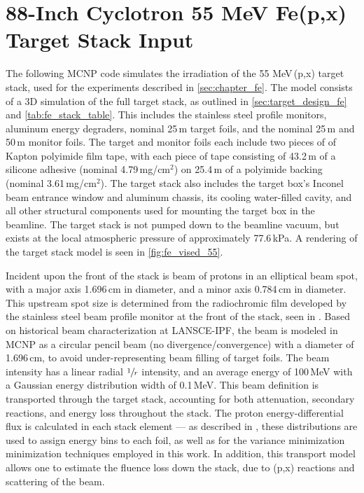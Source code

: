 



\section{88-Inch Cyclotron 55 MeV Fe(p,x) Target Stack Input} \label{sec:88_mcnp_deck}



The following MCNP code simulates the irradiation of the 55 MeV\,(p,x) target stack, used for the experiments described in  \autoref{sec:chapter_fe}.
The model consists of a 3D simulation of the full target stack, as outlined in \autoref{sec:target_design_fe} and  \autoref{tab:fe_stack_table}.
This includes the stainless steel profile monitors, aluminum energy degraders, nominal 25\,\mmicro m  target foils, and the nominal 25\,\mmicro m   and 50\,\mmicro m  monitor foils.
The target and monitor foils each include two pieces of of Kapton polyimide film tape, with each piece of  tape consisting of 43.2\,\mmicro m of a silicone adhesive (nominal 4.79\,mg/cm$^2$) on 25.4\,\mmicro m of a polyimide backing (nominal 3.61\,mg/cm$^2$).
The target stack also includes the target box's Inconel beam entrance window and aluminum chassis, its cooling water-filled cavity, and all other structural components used for mounting the target box in the beamline.
The target stack is not pumped down to the beamline vacuum, but exists at the local atmospheric pressure of approximately 77.6\,kPa.
A rendering of the target stack model  is seen in \autoref{fig:fe_vised_55}.



Incident upon the front of the stack is  beam of protons in an elliptical beam spot, with a major axis 1.696\,cm in diameter, and a minor axis 0.784\,cm in diameter.  
This upstream spot size is determined from the radiochromic film developed by the  stainless steel beam profile monitor at the front of the stack, seen in .
Based on historical beam characterization at LANSCE-IPF, the beam is modeled in MCNP as a circular pencil beam (no divergence/convergence) with a diameter of 1.696\,cm, to avoid under-representing beam filling of target foils.
The beam intensity has a linear radial $\sfrac{1}{r}$ intensity, and an average energy of 100\,MeV  with a Gaussian energy distribution width of 0.1\,MeV.
This beam definition is transported through the target stack, accounting for both attenuation, secondary reactions, and energy loss throughout the stack.
The proton energy-differential flux is calculated in each stack element --- as described in ,  these distributions are used to assign energy bins  to each foil, as well as for the variance minimization minimization techniques employed in this work.
In addition, this transport model allows one to estimate the fluence loss down the stack, due to (p,x) reactions and scattering of the beam.


